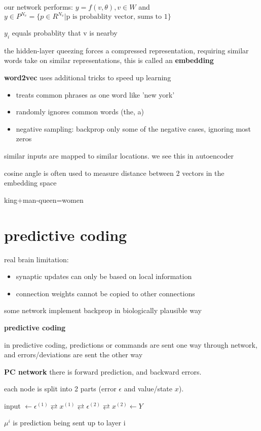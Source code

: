 \documentclass[10pt]{article}
\theoremstyle{break}
\begin{document}
our network performs: 
$y=f(v,\theta), v\in W$ and $y\in P^{N_v}=\{p\in R ^{N_v}|\text{p is probablity vector, sums to 1}\}$

$y_i$ equals probablity that v is nearby

the hidden-layer queezing forces a compressed representation, requiring similar words take on similar representations, this is called an \textbf{embedding}

\textbf{word2vec}
uses additional tricks to speed up learning 
\begin{itemize}
    \item treats common phrases as one word like 'new york'
    \item randomly ignores common words (the, a)
    \item negative sampling: backprop only some of the negative cases, ignoring most zeros 
\end{itemize}

similar inputs are mapped to similar locations. we see this in autoencoder

cosine angle is often used to measure distance between 2 vectors in the embedding space

king+man-queen=women

\section{predictive coding}
real brain limitation: 
\begin{itemize}
    \item  synaptic updates can only be based on local information
    \item connection weights cannot be copied to other connections
\end{itemize}

some network implement backprop in biologically plausible way 

\textbf{predictive coding}

in predictive coding, predictions or commands are sent one way through network, 
and errors/deviations are sent the other way

\textbf{PC network} there is forward prediction, and backward errors. 

each node is split into 2 parts (error $\epsilon$ and value/state $x$).

input $\leftarrow \epsilon^{(1)}\rightleftarrows x^{(1)}\rightleftarrows \epsilon^{(2)}\rightleftarrows x^{(2)}\leftarrow Y$ 

$\mu^i$ is prediction being sent up to layer i 
\end{document}
